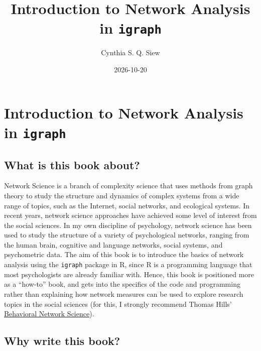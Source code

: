\documentclass[
]{book}
\title{Introduction to Network Analysis in \texttt{igraph}}
\author{Cynthia S. Q. Siew}
\date{2026-10-20}
\begin{document}
\maketitle

{
\setcounter{tocdepth}{1}
\tableofcontents
}
\setcounter{section}{-1}

\chapter*{\texorpdfstring{Introduction to Network Analysis in \texttt{igraph}}{Introduction to Network Analysis in igraph}}\label{introduction-to-network-analysis-in-igraph}

\section{What is this book about?}\label{what-is-this-book-about}

Network Science is a branch of complexity science that uses methods from graph theory to study the structure and dynamics of complex systems from a wide range of topics, such as the Internet, social networks, and ecological systems. In recent years, network science approaches have achieved some level of interest from the social sciences. In my own discipline of psychology, network science has been used to study the structure of a variety of psychological networks, ranging from the human brain, cognitive and language networks, social systems, and psychometric data. The aim of this book is to introduce the basics of network analysis using the \texttt{igraph} package in R, since R is a programming language that most psychologists are already familiar with. Hence, this book is positioned more as a ``how-to'' book, and gets into the specifics of the code and programming rather than explaining how network measures can be used to explore research topics in the social sciences (for this, I strongly recommend Thomas Hills' \href{https://www.amazon.co.uk/Behavioral-Network-Science-Language-Society/dp/1108793339/}{Behavioral Network Science}).

\section{Why write this book?}\label{why-write-this-book}
\end{document}
